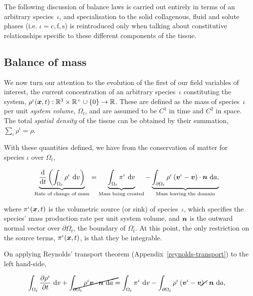 The following discussion of balance laws is carried out entirely in
terms of an arbitrary species~$\iota$, and specialisation to the solid
collagenous, fluid and solute phases (i.e. \mbox{$\iota=\mathrm{c},
  \mathrm{f}, \mathrm{s}$}) is reintroduced only when talking about
constitutive relationships specific to these different components of
the tissue.

\subsection{Balance of mass}
\label{eu-balance-of-mass}

We now turn our attention to the evolution of the first of our field
variables of interest, the current concentration of an arbitrary
species~$\iota$ constituting the system, $\rho^{\iota}(\mbox{\boldmath$ x$},t):
\mathbb{R}^3\times\mathbb{R}^{+}\cup\{0\} \rightarrow
\mathbb{R}$. These are defined as the mass of species~$\iota$ per unit
       {\em system volume}, $\Omega_{t}$, and are assumed to be
       $\mathit{C}^{1}$ in time and $\mathit{C}^{2}$ in space. The
       total {\em spatial density} of the tissue can be obtained by
       their summation, $\sum\limits_{\iota}\rho^\iota = \rho$.

With these quantities defined, we have from the conservation of matter
for species $\iota$ over $\Omega_{t}$,

\begin{equation}
\underbrace{\frac{\mathrm{d}} {\mathrm{d}t}\left(\int_{\Omega_{t}}
  \rho^{\iota} \ \mathrm{d}v \right)}_{\text{Rate of change of mass}}
= \underbrace{\int_{\Omega_{t}} \pi^{\iota} \ \mathrm{d}v}_{\text{Mass
    being created}} - \underbrace{\int_{\partial \Omega_{t}}
  \rho^{\iota} \left(\mbox{\boldmath$ v$}^{\iota} - \mbox{\boldmath$ v$}\right) \cdot
  \mbox{\boldmath$ n$}\ \mathrm{d}a,}_{\text{Mass leaving the domain}}
\label{eu-globalbalanceofmass}
\end{equation}

\noindent where $\pi^{\iota}(\mbox{\boldmath$ x$},t)$ is the volumetric source (or
sink) of species~$\iota$, which specifies the species' mass production
rate per unit system volume, and $\mbox{\boldmath$ n$}$ is the outward normal vector
over $\partial \Omega_{t}$, the boundary of $\Omega_{t}$. At this
point, the only restriction on the source terms, $\pi^{\iota}(\mbox{\boldmath$ x$},t)$,
is that they be integrable.

On applying Reynolds' transport theorem
(Appendix~\ref{reynolds-transport}) to the left hand-side,

\begin{equation*}
\int_{\Omega_{t}} \frac{\partial \rho^{\iota}}{\partial t}
\ \mathrm{d}v + \cancel{\int_{\partial \Omega_{t}} \rho^{\iota} \bv
  \cdot \bn\ \mathrm{d}a} = \int_{\Omega_{t}} \pi^{\iota}
\ \mathrm{d}v - \int_{\partial \Omega_{t}} \rho^{\iota}
\left(\bv^{\iota} - \cancel{\bv}\right) \cdot \bn\ \mathrm{d}a,
\end{equation*}

